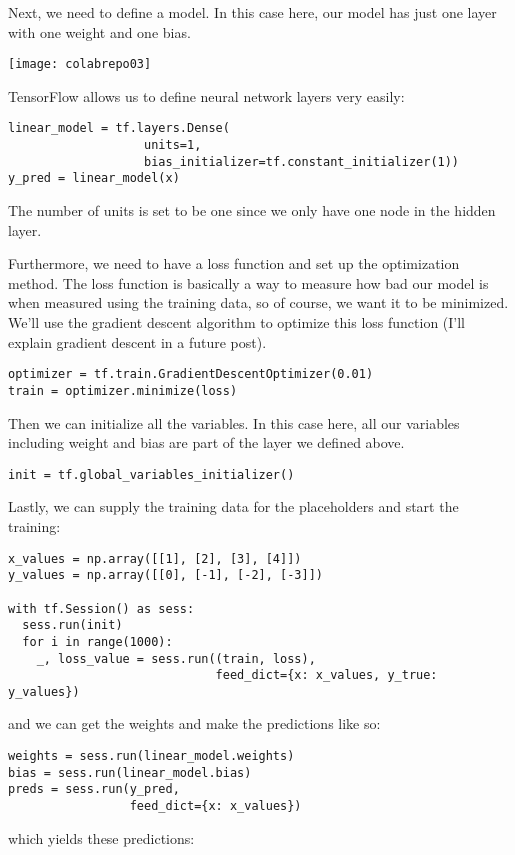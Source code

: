 Next, we need to define a model. In this case here, our model has just one layer with one weight and one bias.

\begin{marginfigure}
\texttt{[image: colabrepo03]}
\end{marginfigure}


TensorFlow allows us to define neural network layers very easily:

\begin{lstlisting}
linear_model = tf.layers.Dense(
                   units=1, 
                   bias_initializer=tf.constant_initializer(1))
y_pred = linear_model(x)
\end{lstlisting}
The number of units is set to be one since we only have one node in the hidden layer.

Furthermore, we need to have a loss function and set up the optimization method. The loss function is basically a way to measure how bad our model is when measured using the training data, so of course, we want it to be minimized. We'll use the gradient descent algorithm to optimize this loss function (I'll explain gradient descent in a future post).

\begin{lstlisting}
optimizer = tf.train.GradientDescentOptimizer(0.01)
train = optimizer.minimize(loss)
\end{lstlisting}
Then we can initialize all the variables. In this case here, all our variables including weight and bias are part of the layer we defined above.

\begin{lstlisting}
init = tf.global_variables_initializer()
\end{lstlisting}
Lastly, we can supply the training data for the placeholders and start the training:

\begin{lstlisting}
x_values = np.array([[1], [2], [3], [4]])
y_values = np.array([[0], [-1], [-2], [-3]])

with tf.Session() as sess:
  sess.run(init)
  for i in range(1000):
    _, loss_value = sess.run((train, loss),
                             feed_dict={x: x_values, y_true: y_values})
\end{lstlisting}
and we can get the weights and make the predictions like so:

\begin{lstlisting}
weights = sess.run(linear_model.weights)
bias = sess.run(linear_model.bias)
preds = sess.run(y_pred, 
                 feed_dict={x: x_values})
\end{lstlisting}
which yields these predictions:

